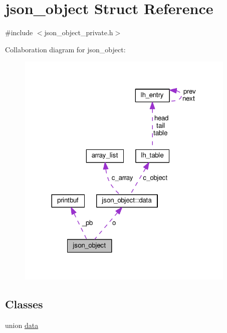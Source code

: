 \hypertarget{structjson__object}{}\section{json\+\_\+object Struct Reference}
\label{structjson__object}


{\ttfamily \#include $<$json\+\_\+object\+\_\+private.\+h$>$}



Collaboration diagram for json\+\_\+object\+:
\nopagebreak
\begin{figure}[H]
\begin{center}
\leavevmode
\includegraphics[width=296pt]{structjson__object__coll__graph}
\end{center}
\end{figure}
\subsection*{Classes}
\begin{DoxyCompactItemize}
\item 
union \hyperlink{unionjson__object_1_1data}{data}
\end{DoxyCompactItemize}
